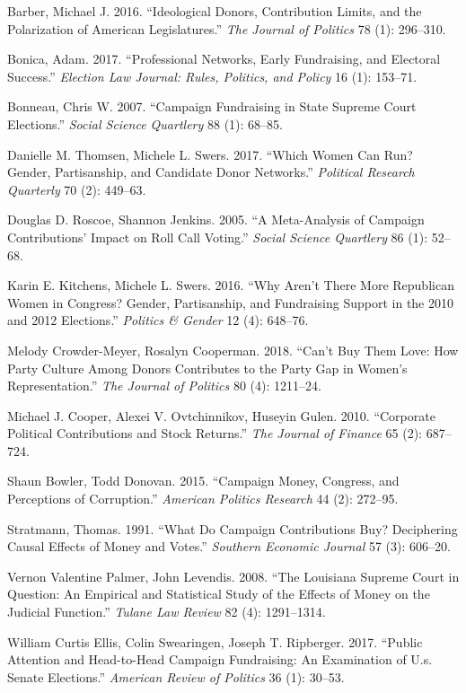 \documentclass[11pt,]{article}
\begin{document}
\leavevmode\hypertarget{ref-barber2016}{}%
Barber, Michael J. 2016. ``Ideological Donors, Contribution Limits, and
the Polarization of American Legislatures.'' \emph{The Journal of
Politics} 78 (1): 296--310.

\leavevmode\hypertarget{ref-bonica2017}{}%
Bonica, Adam. 2017. ``Professional Networks, Early Fundraising, and
Electoral Success.'' \emph{Election Law Journal: Rules, Politics, and
Policy} 16 (1): 153--71.

\leavevmode\hypertarget{ref-bonneau2007}{}%
Bonneau, Chris W. 2007. ``Campaign Fundraising in State Supreme Court
Elections.'' \emph{Social Science Quartlery} 88 (1): 68--85.

\leavevmode\hypertarget{ref-thomsen2017}{}%
Danielle M. Thomsen, Michele L. Swers. 2017. ``Which Women Can Run?
Gender, Partisanship, and Candidate Donor Networks.'' \emph{Political
Research Quarterly} 70 (2): 449--63.

\leavevmode\hypertarget{ref-roscoe2005}{}%
Douglas D. Roscoe, Shannon Jenkins. 2005. ``A Meta-Analysis of Campaign
Contributions' Impact on Roll Call Voting.'' \emph{Social Science
Quartlery} 86 (1): 52--68.

\leavevmode\hypertarget{ref-kitchens2016}{}%
Karin E. Kitchens, Michele L. Swers. 2016. ``Why Aren't There More
Republican Women in Congress? Gender, Partisanship, and Fundraising
Support in the 2010 and 2012 Elections.'' \emph{Politics \& Gender} 12
(4): 648--76.

\leavevmode\hypertarget{ref-crowder-meyer2018}{}%
Melody Crowder-Meyer, Rosalyn Cooperman. 2018. ``Can't Buy Them Love:
How Party Culture Among Donors Contributes to the Party Gap in Women's
Representation.'' \emph{The Journal of Politics} 80 (4): 1211--24.

\leavevmode\hypertarget{ref-cooper2010}{}%
Michael J. Cooper, Alexei V. Ovtchinnikov, Huseyin Gulen. 2010.
``Corporate Political Contributions and Stock Returns.'' \emph{The
Journal of Finance} 65 (2): 687--724.

\leavevmode\hypertarget{ref-bowler2015}{}%
Shaun Bowler, Todd Donovan. 2015. ``Campaign Money, Congress, and
Perceptions of Corruption.'' \emph{American Politics Research} 44 (2):
272--95.

\leavevmode\hypertarget{ref-stratmann1991}{}%
Stratmann, Thomas. 1991. ``What Do Campaign Contributions Buy?
Deciphering Causal Effects of Money and Votes.'' \emph{Southern Economic
Journal} 57 (3): 606--20.

\leavevmode\hypertarget{ref-palmer2008}{}%
Vernon Valentine Palmer, John Levendis. 2008. ``The Louisiana Supreme
Court in Question: An Empirical and Statistical Study of the Effects of
Money on the Judicial Function.'' \emph{Tulane Law Review} 82 (4):
1291--1314.

\leavevmode\hypertarget{ref-ellis2017}{}%
William Curtis Ellis, Colin Swearingen, Joseph T. Ripberger. 2017.
``Public Attention and Head-to-Head Campaign Fundraising: An Examination
of U.s. Senate Elections.'' \emph{American Review of Politics} 36 (1):
30--53.





\newpage
\singlespacing 
\end{document}
